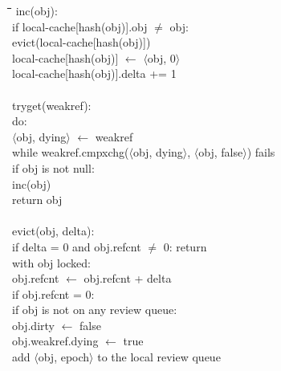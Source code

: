 \begin{figure}
  \def\fgap{-0.25em}            %
  \small
  \begin{tabbing}
    \quad\=\quad\=\quad\=\quad\=\quad\=\quad\=\kill
    inc(obj): \+\\
      if local-cache[hash(obj)].obj $\ne$ obj: \+\\
        evict(local-cache[hash(obj)]) \\
        local-cache[hash(obj)] $\gets$ $\langle$obj, 0$\rangle$ \-\\
      local-cache[hash(obj)].delta += 1 \\
    \-\\[\fgap]
    tryget(weakref): \+\\
      do: \+\\
        $\langle$obj, dying$\rangle$ $\gets$ weakref \-\\
      while weakref.cmpxchg($\langle$obj, dying$\rangle$,
        $\langle$obj, false$\rangle$) fails \\
      if obj is not null: \+\\
        inc(obj) \-\\
      return obj \\
    \-\\[\fgap]
    evict(obj, delta): \+\\
      if delta = 0 and obj.refcnt $\ne$ 0: return \\
      with obj locked: \+\\
        obj.refcnt $\gets$ obj.refcnt + delta \\
        if obj.refcnt = 0: \+\\
          if obj is not on any review queue: \+\\
            obj.dirty $\gets$ false \\
            obj.weakref.dying $\gets$ true \\
            add $\langle$obj, epoch$\rangle$ to the local review
            queue \-\\

\end{tabbing}
\end{figure}
